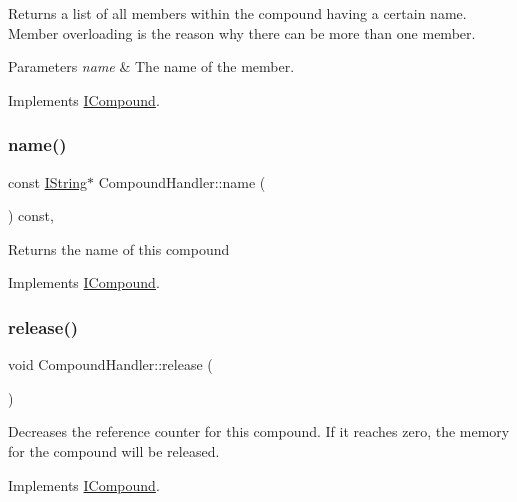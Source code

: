 Returns a list of all members within the compound having a certain name. Member overloading is the reason why there can be more than one member. 
\begin{DoxyParams}{Parameters}
{\em name} & The name of the member. \\
\hline
\end{DoxyParams}


Implements \mbox{\hyperlink{class_i_compound_af94f0805a794ec5f413c9e16347e2591}{I\+Compound}}.

\mbox{\label{class_compound_handler_ac7c192318d397bf053bb3ee44903aca7}} 
\subsubsection{\texorpdfstring{name()}{name()}}
{\footnotesize\ttfamily const \mbox{\hyperlink{class_i_string}{I\+String}}$\ast$ Compound\+Handler\+::name (\begin{DoxyParamCaption}{ }\end{DoxyParamCaption}) const\hspace{0.3cm}{\ttfamily [inline]}, {\ttfamily [virtual]}}

Returns the name of this compound 

Implements \mbox{\hyperlink{class_i_compound_ae14b5dcf513ef0d263119aeb2e2ffb15}{I\+Compound}}.

\mbox{\label{class_compound_handler_a29f352627cbc021762c72835dfb63778}} 
\subsubsection{\texorpdfstring{release()}{release()}}
{\footnotesize\ttfamily void Compound\+Handler\+::release (\begin{DoxyParamCaption}{ }\end{DoxyParamCaption})\hspace{0.3cm}{\ttfamily [virtual]}}

Decreases the reference counter for this compound. If it reaches zero, the memory for the compound will be released. 

Implements \mbox{\hyperlink{class_i_compound_a5388c74d390323ce610f752a01456b21}{I\+Compound}}.

